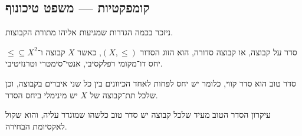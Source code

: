 \subsection{קומפקטיות --- משפט טיכונוף}
ניזכר בכמה הגדרות שמגיעות אליהו מתורת הקבוצות.
\begin{definition}
	סדר על קבוצה, או קבוצה סדורה, הוא הזוג הסדור $(X, \le)$, כאשר $X$ קבוצה ו־$\le \subseteq X^2$ יחס דו־מקומי רפלקסיבי, אנטי־סימטרי וטרנזיטיבי.
\end{definition}
\begin{definition}
	סדר טוב הוא סדר קווי, כלומר יש יחס לפחות לאחד הכיוונים בין כל שני איברים בקבוצה,
	וכן שלכל תת־קבוצה של $X$ יש מינימלי ביחס הסדר.
\end{definition}
עיקרון הסדר הטוב מעיד שלכל קבוצה יש סדר טוב כלשהו שמוגדר עליה, והוא שקול לאקסיומת הבחירה.

